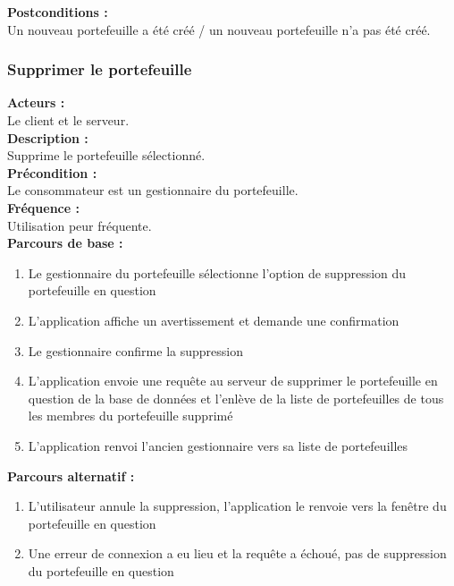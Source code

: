 \documentclass[../rapport.tex]{subfiles}
\begin{document}
\textbf{Postconditions :} \\
Un nouveau portefeuille a été créé / un nouveau portefeuille n'a pas été créé. \\



\subsubsection{Supprimer le portefeuille}

\textbf{Acteurs :} \\
Le client et le serveur. \\

\textbf{Description :} \\
Supprime le portefeuille sélectionné. \\

\textbf{Précondition :} \\
Le consommateur est un gestionnaire du portefeuille. \\

\textbf{Fréquence :} \\
Utilisation peur fréquente. \\

\textbf{Parcours de base :} \\
\begin{enumerate}
    \item Le gestionnaire du portefeuille sélectionne l’option de suppression du portefeuille en question
    \item L’application affiche un avertissement et demande une confirmation
    \item Le gestionnaire confirme la suppression
    \item L’application envoie une requête au serveur de supprimer le portefeuille en question de la base de données et l’enlève de la liste de portefeuilles de tous les membres du portefeuille supprimé
    \item L’application renvoi l’ancien gestionnaire vers sa liste de portefeuilles
\end{enumerate}
\bigskip

\textbf{Parcours alternatif :}
\begin{enumerate}
    \item L'utilisateur annule la suppression, l'application le renvoie vers la fenêtre du portefeuille en question
    \item Une erreur de connexion a eu lieu et la requête a échoué, pas de suppression du portefeuille en question
\end{enumerate}
\end{document}
